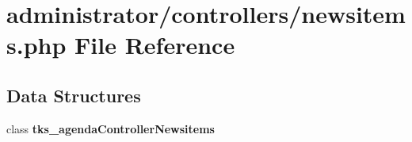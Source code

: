 \section{administrator/controllers/newsitems.php File Reference}
\label{administrator_2controllers_2newsitems_8php}
\subsection*{Data Structures}
\begin{DoxyCompactItemize}
\item 
class \textbf{ tks\+\_\+agenda\+Controller\+Newsitems}
\end{DoxyCompactItemize}
